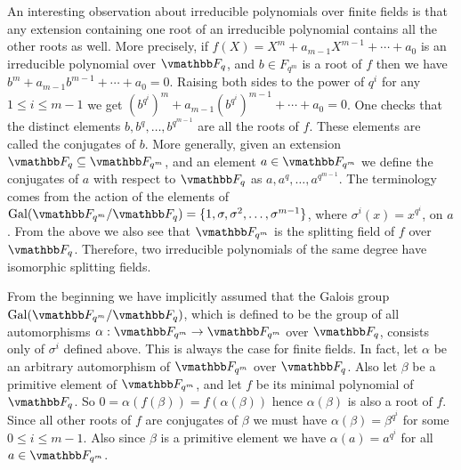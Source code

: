 An interesting observation about irreducible polynomials over finite fields is that any extension 
containing one root of an irreducible polynomial contains all the other roots as well. More 
precisely, if $f(X) = X^m + a_{m - 1}X^{m - 1} + \cdots + a_0$ is an irreducible polynomial over 
$\F_q$, and $b \in F_{q^m}$ is a root of $f$ then we have $b^m + a_{m - 1}b^{m - 1} + \cdots + a_0 
= 0$. Raising both sides to the power of $q^i$ for any $1 \le i \le m - 1$ we get $(b^{q^i})^m + 
a_{m - 1}(b^{q^i})^{m - 1} + \cdots + a_0 = 0$. One checks that the distinct elements $b, b^q, 
\dots, b^{q^{m - 1}}$ are all the roots of $f$. These elements are called the conjugates of $b$. 
More generally, given an extension $\F_q \subseteq \F_{q^m}$, and an element $a \in \F_{q^m}$ we 
define the conjugates of $a$ with respect to $\F_q$ as $a, a^q, \dots, a^{q^{m - 1}}$. The 
terminology comes from the action of the elements of $\gal(\F_{q^m} / \F_q) = \{1, \sigma, 
\sigma^2, \dots, \sigma^{m - 1}\}$, where $\sigma^i(x) = x^{q^i}$, on $a$. From the above we also 
see that $\F_{q^m}$ is the splitting field of $f$ over $\F_q$. Therefore, two irreducible 
polynomials of the same degree have isomorphic splitting fields. 

From the beginning we have implicitly assumed that the Galois group $\gal(\F_{q^m} / \F_q)$, which 
is defined to be the group of all automorphisms $\alpha: \F_{q^m} \rightarrow \F_{q^m}$ over 
$\F_q$, consists only of $\sigma^i$ defined above. This is always the case for finite fields. In 
fact, let $\alpha$ be an arbitrary automorphism of $\F_{q^m}$ over $\F_q$. Also let $\beta$ be a 
primitive element of $\F_{q^m}$, and let $f$ be its minimal polynomial of $\F_q$. So $0 = 
\alpha(f(\beta)) = f(\alpha(\beta))$ hence $\alpha(\beta)$ is also a root of $f$. Since all other 
roots of $f$ are conjugates of $\beta$ we must have $\alpha(\beta) = \beta^{q^i}$ for some $0 \le i 
\le m - 1$. Also since $\beta$ is a primitive element we have $\alpha(a) = a^{q^i}$ for all $a \in 
\F_{q^m}$.

